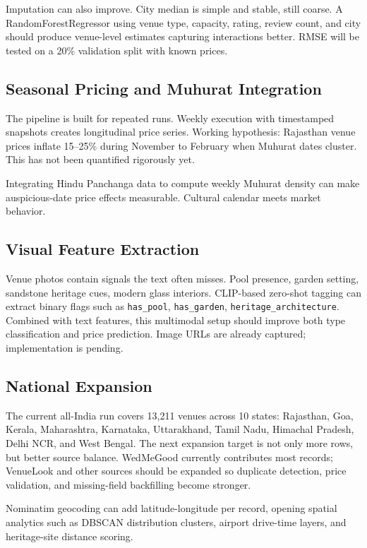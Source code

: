 \documentclass[conference]{IEEEtran}
\begin{document}
Imputation can also improve. City median is simple and stable, still coarse. A RandomForestRegressor using venue type, capacity, rating, review count, and city should produce venue-level estimates capturing interactions better. RMSE will be tested on a 20\% validation split with known prices.

\subsection{Seasonal Pricing and Muhurat Integration}

The pipeline is built for repeated runs. Weekly execution with timestamped snapshots creates longitudinal price series. Working hypothesis: Rajasthan venue prices inflate 15--25\% during November to February when Muhurat dates cluster. This has not been quantified rigorously yet.

Integrating Hindu Panchanga data to compute weekly Muhurat density can make auspicious-date price effects measurable. Cultural calendar meets market behavior.

\subsection{Visual Feature Extraction}

Venue photos contain signals the text often misses. Pool presence, garden setting, sandstone heritage cues, modern glass interiors. CLIP-based zero-shot tagging can extract binary flags such as \texttt{has\_pool}, \texttt{has\_garden}, \texttt{heritage\_architecture}. Combined with text features, this multimodal setup should improve both type classification and price prediction. Image URLs are already captured; implementation is pending.

\subsection{National Expansion}

The current all-India run covers 13,211 venues across 10 states: Rajasthan, Goa, Kerala, Maharashtra, Karnataka, Uttarakhand, Tamil Nadu, Himachal Pradesh, Delhi NCR, and West Bengal. The next expansion target is not only more rows, but better source balance. WedMeGood currently contributes most records; VenueLook and other sources should be expanded so duplicate detection, price validation, and missing-field backfilling become stronger.

Nominatim geocoding can add latitude-longitude per record, opening spatial analytics such as DBSCAN distribution clusters, airport drive-time layers, and heritage-site distance scoring.
\end{document}
